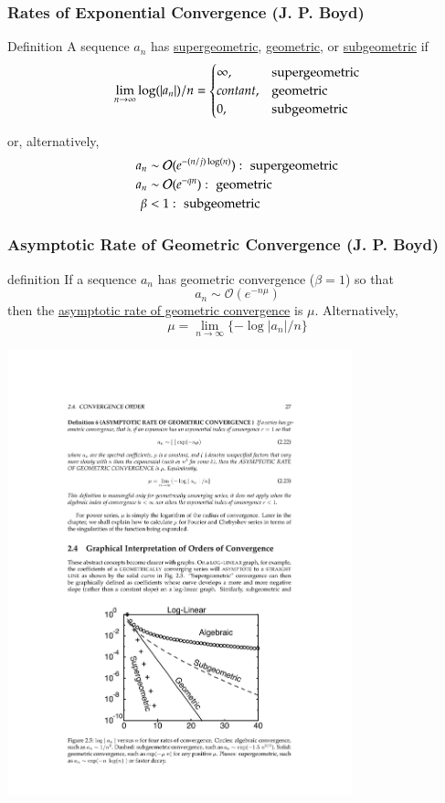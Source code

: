 \documentclass[10pt]{beamer}
\newcommand{\mO}{{\mathcal{O}}}
\begin{document}
\begin{frame}
\frametitle{Rates of Exponential Convergence (J. P. Boyd)}
\begin{block}{Definition}
A sequence $a_{n}$ has {\underline{supergeometric}, \underline{geometric}, or \underline{subgeometric}} if
\[
\lim_{n\rightarrow\infty} \log(|a_{n}|)/n =
\begin{cases}
\infty, & \textnormal{supergeometric}\\
contant, & \textnormal{geometric}\\
0, & \textnormal{subgeometric}\\
\end{cases}
\]
\bigskip

or, alternatively,
\begin{align*}
a_{n} & \sim \mO(e^{-(n/j)\log(n)}): \,\,\textnormal{supergeometric} \\
a_{n} & \sim \mO(e^{-qn}): \,\,\textnormal{geometric} \\
\beta & < 1: \,\,\textnormal{subgeometric}\\
\end{align*}
\end{block}
\end{frame}
\begin{frame}
\frametitle{Asymptotic Rate of Geometric Convergence (J. P. Boyd)}
\begin{block}{definition}
If a sequence $a_{n}$ has geometric convergence ($\beta=1$) so that 
\[
a_{n} \sim \mO(e^{-n\mu})
\]
then the {\underline{asymptotic rate of geometric convergence}} is $\mu$.  Alternatively,
\[
\mu = \lim_{n\rightarrow\infty} \{ -\log |a_{n}|/n\}
\]
\end{block}
\end{frame}
\begin{frame}
\includegraphics[width=10cm]{./figs/conv1}
\end{frame}
\end{document}
